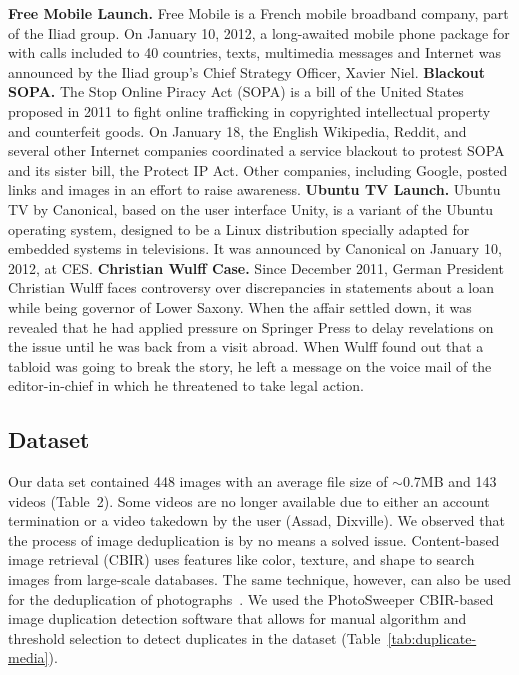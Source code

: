 \textbf{Free Mobile Launch.} Free Mobile is a French mobile broadband company, part of the Iliad group. On January 10, 2012, a long-awaited mobile phone package for  with calls included to 40 countries, texts, multimedia messages and Internet was announced by the Iliad group's Chief Strategy Officer, Xavier Niel.
\newline
\textbf{Blackout SOPA.} The Stop Online Piracy Act (SOPA) is a bill of the United States proposed in 2011 to fight online trafficking in copyrighted intellectual property and counterfeit goods. On January 18, the English Wikipedia, Reddit, and several other Internet companies coordinated a service blackout to protest SOPA and its sister bill, the Protect IP Act. Other companies, including Google, posted links and images in an effort to raise awareness.
\newline
\textbf{Ubuntu TV Launch.} Ubuntu TV by Canonical, based on the user interface Unity, is a variant of the Ubuntu operating system, designed to be a Linux distribution specially adapted for embedded systems in televisions. It was announced by Canonical on January 10, 2012, at CES.
\newline
\textbf{Christian Wulff Case.} Since December 2011, German President Christian Wulff faces controversy over discrepancies in statements about a loan while being governor of Lower Saxony. When the affair settled down, it was revealed that he had applied pressure on Springer Press to delay revelations on the issue until he was back from a visit abroad. When Wulff found out that a tabloid was going to break the story, he left a message on the voice mail of the editor-in-chief in which he threatened to take legal action.

\subsection{Dataset}
Our data set contained 448 images with an average file size of $\sim$0.7MB and 143 videos (Table~2). Some videos are no longer available due to either an account termination or a video takedown by the user (Assad, Dixville). We observed that the process of image deduplication is by no means a solved issue. Content-based image retrieval (CBIR) uses features like color, texture, and shape to search images from large-scale databases. The same technique, however, can also be used for the deduplication of photographs~\cite{Pattabhi:RAICS11}. We used the PhotoSweeper CBIR-based image duplication detection software that allows for manual algorithm and threshold selection to detect duplicates in the dataset (Table~\ref{tab:duplicate-media}).

